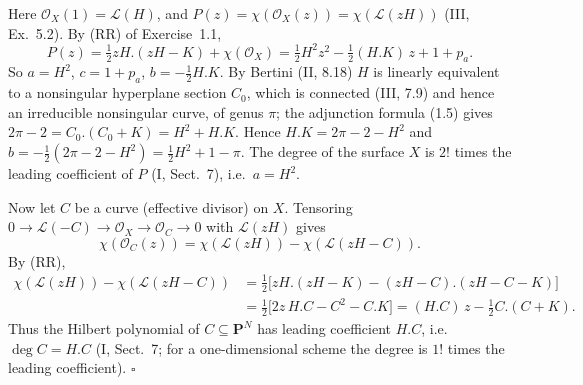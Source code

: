 \documentclass[11pt]{article}
\begin{document}
\pf
Here $\mathcal O_X(1)=\mathcal L(H)$, and $P(z)=\chi(\mathcal O_X(z))=\chi(\mathcal L(zH))$ (III, Ex.~5.2). By (RR) of Exercise~1.1,
\[ P(z)=\tfrac12 zH.(zH-K)+\chi(\mathcal O_X)=\tfrac12H^2z^2-\tfrac12 (H.K)\,z+1+p_a. \]
So $a=H^2$, $c=1+p_a$, $b=-\frac12H.K$. By Bertini (II, 8.18) $H$ is linearly equivalent to a nonsingular hyperplane section $C_0$, which is connected (III, 7.9) and hence an irreducible nonsingular curve, of genus $\pi$; the adjunction formula (1.5) gives $2\pi-2=C_0.(C_0+K)=H^2+H.K$. Hence $H.K=2\pi-2-H^2$ and $b=-\frac12(2\pi-2-H^2)=\frac12H^2+1-\pi$. The degree of the surface $X$ is $2!$ times the leading coefficient of $P$ (I, Sect.~7), i.e.\ $a=H^2$.

Now let $C$ be a curve (effective divisor) on $X$. Tensoring $0\to\mathcal L(-C)\to\mathcal O_X\to\mathcal O_C\to0$ with $\mathcal L(zH)$ gives
\[ \chi(\mathcal O_C(z))=\chi(\mathcal L(zH))-\chi(\mathcal L(zH-C)). \]
By (RR),
\begin{align*}
\chi(\mathcal L(zH))-\chi(\mathcal L(zH-C))&=\tfrac12\bigl[zH.(zH-K)-(zH-C).(zH-C-K)\bigr]\\
&=\tfrac12\bigl[2z\,H.C-C^2-C.K\bigr]=(H.C)\,z-\tfrac12C.(C+K).
\end{align*}
Thus the Hilbert polynomial of $C\subseteq\mathbf P^N$ has leading coefficient $H.C$, i.e.\ $\deg C=H.C$ (I, Sect.~7; for a one-dimensional scheme the degree is $1!$ times the leading coefficient). \hfill$\square$
\end{document}
